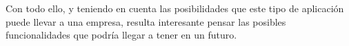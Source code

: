 \documentclass{\ClassPath/viu-tfm-template}
\begin{document}
Con todo ello, y teniendo en cuenta las posibilidades que este tipo de aplicación puede llevar a una empresa, resulta interesante pensar las posibles funcionalidades que podría llegar a tener en un futuro.


\vfill
\pagebreak


\printbibliography[title={Referencias bibliográficas},heading=bibintoc]
%
%
\end{document}
